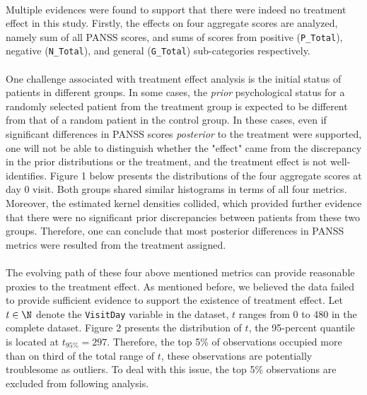 \documentclass[11pt]{article}
\begin{document}
	\paragraph{}Multiple evidences were found to support that there were indeed no treatment effect in this study. Firstly, the effects on four aggregate scores are analyzed, namely sum of all PANSS scores, and sums of scores from positive (\texttt{P\_Total}), negative (\texttt{N\_Total}), and general (\texttt{G\_Total}) sub-categories respectively.
	
	\paragraph{}One challenge associated with treatment effect analysis is the initial status of patients in different groups. In some cases, the \emph{prior} psychological status for a randomly selected patient from the treatment group is expected to be different from that of a random patient in the control group. In these cases, even if significant differences in PANSS scores \emph{posterior} to the treatment were supported, one will not be able to distinguish whether the "effect" came from the discrepancy in the prior distributions or the treatment, and the treatment effect is not well-identifies.
	Figure 1 below presents the distributions of the four aggregate scores at day 0 visit. Both groups shared similar histograms in terms of all four metrics. Moreover, the estimated kernel densities collided, which provided further evidence that there were no significant prior discrepancies between patients from these two groups. Therefore, one can conclude that most posterior differences in PANSS metrics were resulted from the treatment assigned.


	\paragraph{}The evolving path of these four above mentioned metrics can provide reasonable proxies to the treatment effect. As mentioned before, we believed the data failed to provide sufficient evidence to support the existence of treatment effect. Let $t \in \N$ denote the \texttt{VisitDay} variable in the dataset, $t$ ranges from 0 to 480 in the complete dataset. Figure 2 presents the distribution of $t$, the 95-percent quantile is located at $t_{95\%} = 297$. Therefore, the top 5\% of observations occupied more than on third of the total range of $t$, these observations are potentially troublesome as outliers. To deal with this issue, the top 5\% observations are excluded from following analysis.
\end{document}
